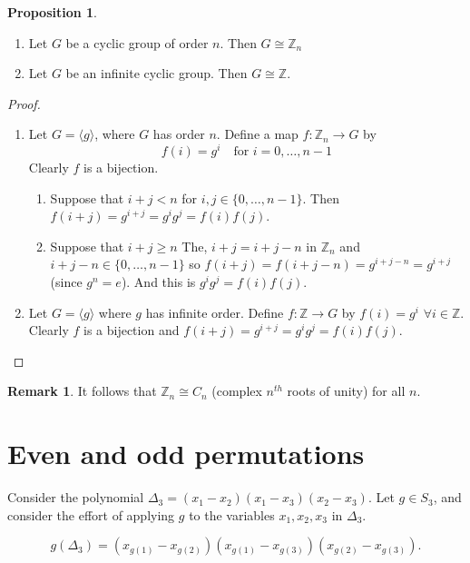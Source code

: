\documentclass{article}
\theoremstyle{definition}
\newtheorem{proposition}{Proposition}
\newtheorem*{remark}{Remark}
\newcommand{\ism}{\cong}
\begin{document}
\begin{proposition}\hfill
  \begin{enumerate}
    \item Let $G$ be a cyclic group of order $n$. Then $G \ism \mathbb{Z}_n$
    \item Let $G$ be an infinite cyclic group. Then $G \ism \mathbb{Z}$.
  \end{enumerate}
\end{proposition}

\begin{proof}\hfill
  \begin{enumerate}
    \item Let $G=\langle g \rangle $, where $G$ has order $n$. Define a map $f : \mathbb{Z}_n \rightarrow G$ by 
      $$f(i)=g^i \quad \text{for } i=0,\ldots,n-1$$
    Clearly $f$ is a bijection.
    \begin{enumerate}
      \item Suppose that $i+j<n$ for $i,j \in \{0,\ldots,n-1\}.$ Then $f(i+j)=g^{i+j}=g^i g^j = f(i)f(j)$.
      \item Suppose that $i+j \geq n$ The, $i+j = i+j-n$ in $\mathbb{Z}_n$ and $i+j-n \in \{0,\ldots,n-1\}$ so $f(i+j)=f(i+j-n)=g^{i+j-n}=g^{i+j}$ (since $g^n=e$).
        And this is $g^i g^j = f(i) f(j)$.
    \end{enumerate}
  \item Let $G=\langle g \rangle$ where $g$ has infinite order. Define $f : \mathbb{Z} \rightarrow G$ by $f(i)=g^i$ $\forall i \in \mathbb{Z}$. Clearly $f$ is a bijection and $f(i+j)=g^{i+j}=g^i g^j = f(i) f(j)$.
  \end{enumerate}
\end{proof}

\begin{remark}
  It follows that $\mathbb{Z}_n \ism C_n$ (complex $n^{th}$ roots of unity) for all $n$.
\end{remark}

\section{Even and odd permutations}

Consider the polynomial $\Delta_3 = (x_1 - x_2)(x_1 - x_3) (x_2 - x_3)$. 
Let $g \in S_3$, and consider the effort of applying $g$ to the variables $x_1, x_2, x_3$ in $\Delta_3$.

$$g(\Delta_3) = (x_{g(1)} - x_{g(2)})(x_{g(1)} - x_{g(3)})(x_{g(2)} - x_{g(3)}).$$
\end{document}
